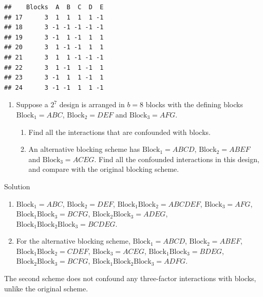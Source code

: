 \documentclass[
]{book}
\theoremstyle{definition}
\theoremstyle{definition}
\theoremstyle{definition}
\theoremstyle{definition}
\theoremstyle{remark}
\begin{document}
\begin{verbatim}
##    Blocks  A  B  C  D  E
## 17      3  1  1  1  1 -1
## 18      3 -1 -1 -1 -1 -1
## 19      3 -1  1 -1  1  1
## 20      3  1 -1 -1  1  1
## 21      3  1  1 -1 -1 -1
## 22      3  1 -1  1 -1  1
## 23      3 -1  1  1 -1  1
## 24      3 -1 -1  1  1 -1
\end{verbatim}

\begin{enumerate}
\def\labelenumi{\arabic{enumi}.}
\setcounter{enumi}{1}
\item
  Suppose a \(2^7\) design is arranged in \(b=8\) blocks with the defining blocks \(\mathrm{Block}_1 = ABC\), \(\mathrm{Block}_2 = DEF\) and \(\mathrm{Block}_3 = AFG\).

  \begin{enumerate}
  \def\labelenumii{\alph{enumii}.}
  \item
    Find all the interactions that are confounded with blocks.
  \item
    An alternative blocking scheme has \(\mathrm{Block}_1 = ABCD\), \(\mathrm{Block}_2 = ABEF\) and \(\mathrm{Block}_3 = ACEG\). Find all the confounded interactions in this design, and compare with the original blocking scheme.
  \end{enumerate}
\end{enumerate}

Solution

\begin{enumerate}
\def\labelenumi{\alph{enumi}.}
\item
  \(\mathrm{Block}_1 = ABC\), \(\mathrm{Block}_2 = DEF\), \(\mathrm{Block}_1\mathrm{Block}_2 = ABCDEF\), \(\mathrm{Block}_3 = AFG\), \(\mathrm{Block}_1\mathrm{Block}_3 = BCFG\), \(\mathrm{Block}_2\mathrm{Block}_3 = ADEG\), \(\mathrm{Block}_1\mathrm{Block}_2\mathrm{Block}_3 = BCDEG\).
\item
  For the alternative blocking scheme, \(\mathrm{Block}_1 = ABCD\), \(\mathrm{Block}_2 = ABEF\), \(\mathrm{Block}_1\mathrm{Block}_2 = CDEF\), \(\mathrm{Block}_3 = ACEG\), \(\mathrm{Block}_1\mathrm{Block}_3 = BDEG\), \(\mathrm{Block}_2\mathrm{Block}_3 = BCFG\), \(\mathrm{Block}_1\mathrm{Block}_2\mathrm{Block}_3 = ADFG\).
\end{enumerate}

The second scheme does not confound any three-factor interactions with blocks, unlike the original scheme.
\end{document}
